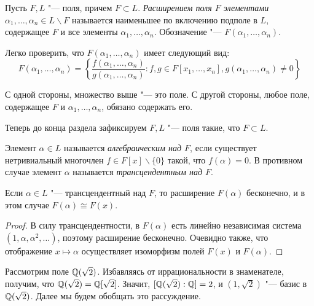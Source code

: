 \begin{definition}
	Пусть $F, L$ "--- поля, причем $F \subset L$. \textit{Расширением поля $F$ элементами} $\alpha_1, \dotsc, \alpha_n \in L \backslash F$ называется наименьшее по включению подполе в $L$, содержащее $F$ и все элементы $\alpha_1, \dotsc, \alpha_n$. Обозначение "--- $F(\alpha_1, \dotsc, \alpha_n)$.
\end{definition}

\begin{note}
	Легко проверить, что $F(\alpha_1, \dotsc, \alpha_n)$ имеет следующий вид:
	\[F(\alpha_1, \dotsc, \alpha_n) = \left\{\frac{f(\alpha_1, \dotsc, \alpha_n)}{g(\alpha_1, \dotsc, \alpha_n)}: f, g \in F[x_1, \dotsc, x_n], g(\alpha_1, \dotsc, \alpha_n) \ne 0\right\}\]
	
	С одной стороны, множество выше "--- это поле. С другой стороны, любое поле, содержащее $F$ и $\alpha_1, \dotsc, \alpha_n$, обязано содержать его.
\end{note}

Теперь до конца раздела зафиксируем $F, L$ "--- поля такие, что $F \subset L$.

\begin{definition}
	Элемент $\alpha \in L$ называется \textit{алгебраическим над $F$}, если существует нетривиальный многочлен $f \in F[x] \backslash \{0\}$ такой, что $f(\alpha) = 0$. В противном случае элемент $\alpha$ называется \textit{трансцендентным над $F$}.
\end{definition}

\begin{proposition}
	Если $\alpha \in L$ "--- трансцендентный над $F$, то расширение $F(\alpha)$ бесконечно, и в этом случае $F(\alpha) \cong F(x)$.
\end{proposition}

\begin{proof}
	В силу трансцендентности, в $F(\alpha)$ есть линейно независимая система $(1, \alpha, \alpha^2, \dotsc)$, поэтому расширение бесконечно. Очевидно также, что отображение $x \mapsto \alpha$ осуществляет изоморфизм полей $F(x)$ и $F(\alpha)$.
\end{proof}

\begin{example}
	Рассмотрим поле $\mathbb{Q}(\sqrt{2})$. Избавляясь от иррациональности в знаменателе, получим, что $\mathbb{Q}(\sqrt{2}) = \mathbb{Q}[\sqrt{2}]$. Значит, $[\mathbb{Q}(\sqrt{2}) : \mathbb{Q}] = 2$, и $(1, \sqrt{2})$ "--- базис в $\mathbb{Q}(\sqrt{2})$. Далее мы будем обобщать это рассуждение.
\end{example}

